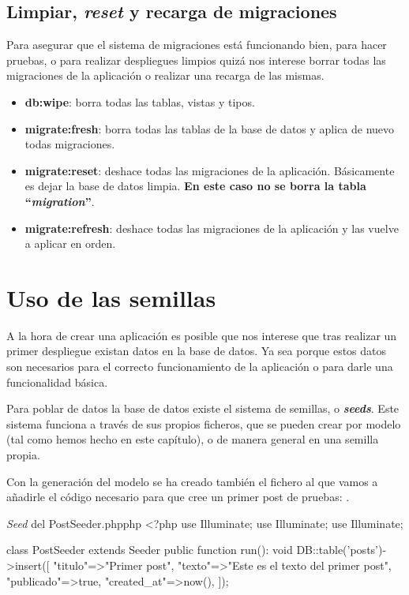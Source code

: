 \subsection{Limpiar, \textit{reset} y recarga de migraciones}

Para asegurar que el sistema de migraciones está funcionando bien, para hacer pruebas, o para realizar despliegues limpios quizá nos interese borrar todas las migraciones de la aplicación o realizar una recarga de las mismas.

\begin{itemize}
    \item \textbf{db:wipe}: borra todas las tablas, vistas y tipos.
    \item \textbf{migrate:fresh}: borra todas las tablas de la base de datos y aplica de nuevo todas migraciones.
    \item \textbf{migrate:reset}: deshace todas las migraciones de la aplicación. Básicamente es dejar la base de datos limpia. \textbf{En este caso no se borra la tabla “\textit{migration}”}.
    \item \textbf{migrate:refresh}: deshace todas las migraciones de la aplicación y las vuelve a aplicar en orden.
\end{itemize}


\section{Uso de las semillas}

A la hora de crear una aplicación es posible que nos interese que tras realizar un primer despliegue existan datos en la base de datos. Ya sea porque estos datos son necesarios para el correcto funcionamiento de la aplicación o para darle una funcionalidad básica.

Para poblar de datos la base de datos existe el sistema de semillas, o \textbf{\textit{seeds}}. Este sistema funciona a través de sus propios ficheros, que se pueden crear por modelo (tal como hemos hecho en este capítulo), o de manera general en una semilla propia.

Con la generación del modelo se ha creado también el fichero  al que vamos a añadirle el código necesario para que cree un primer post de pruebas: .

\begin{mycode}{\textit{Seed} del PostSeeder.php}{php}{}
<?php
use Illuminate\Database\Console\Seeds\WithoutModelEvents;
use Illuminate\Database\Seeder;
use Illuminate\Support\Facades\DB;

class PostSeeder extends Seeder {
    public function run(): void {
        DB::table('posts')->insert([
            "titulo"=>"Primer post",
            "texto"=>"Este es el texto del primer post",
            "publicado"=>true,
            "created_at"=>now(),
        ]);
    }
}
\end{mycode}

